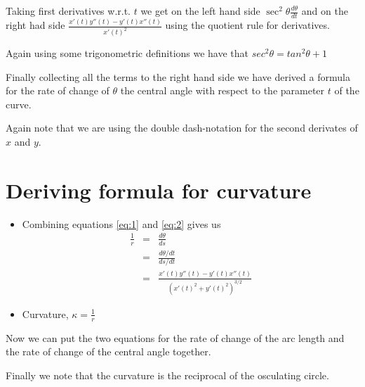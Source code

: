 \documentclass[12pt]{article} %
\theoremstyle{definition}
\theoremstyle{theorem}
\begin{document}
Taking first derivatives w.r.t. $t$ we get on the left hand side $\sec ^2 \theta \frac{d\theta}{dt}$ and on the right had side $\frac{x'(t) y''(t) - y'(t) x''(t)}{x'(t)^2}$ using the quotient rule for derivatives.

Again using some trigonometric definitions we have that $sec^2\theta = tan^2\theta +1$ 

Finally collecting all the terms to the right hand side we have derived a formula for the rate of change of $\theta$ the central angle with respect to the parameter $t$ of the curve.

Again note that we are using the double dash-notation for the second derivates of $x$ and $y$.

\section{Deriving formula for curvature}
\begin{tcolorbox}
	\begin{itemize}
		\item Combining equations \ref{eq:1} and \ref{eq:2} gives us
		\begin{eqnarray*}
			\frac1r &=& \frac{d\theta}{ds} \\
					&=& \frac{d\theta/dt}{ds/dt}  \\
			        &=& \frac{x'(t) y''(t) - y'(t) x''(t)}{\left(x'(t)^2 + y'(t)^2 \right)^{3/2}}
		\end{eqnarray*}	
		\item Curvature, $\kappa = \frac1r$
	\end{itemize}
\end{tcolorbox}

Now we can put the two equations for the rate of change of the arc length and the rate of change of the central angle together.

Finally we note that the curvature is the reciprocal of the osculating circle.
\end{document}
